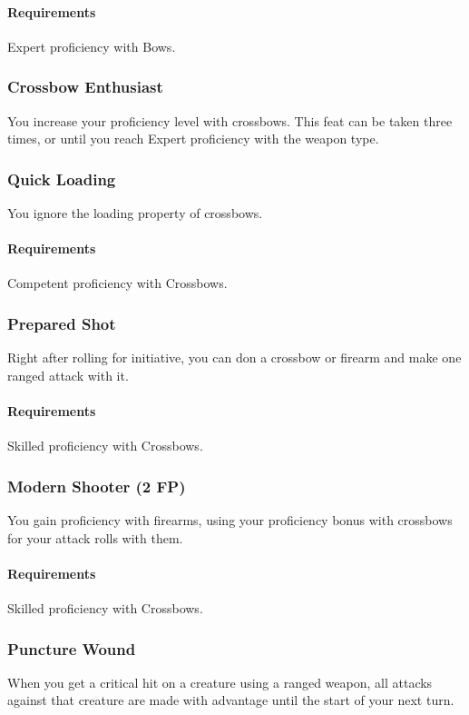     \paragraph{Requirements} Expert proficiency with Bows.
\subsubsection{Crossbow Enthusiast} \label{feat::crossbowenthusiast}
    You increase your proficiency level with crossbows.
    This feat can be taken three times, or until you reach Expert proficiency with the weapon type.
\subsubsection{Quick Loading} \label{feat::quickloading}
    You ignore the loading property of crossbows.
    \paragraph{Requirements} Competent proficiency with Crossbows.
\subsubsection{Prepared Shot} \label{feat::preparedshot}
    Right after rolling for initiative, you can don a crossbow or firearm and make one ranged attack with it.
    \paragraph{Requirements} Skilled proficiency with Crossbows.
\subsubsection{Modern Shooter (2 FP)} \label{feat::modernshooter}
    You gain proficiency with firearms, using your proficiency bonus with crossbows for your attack rolls with them.
    \paragraph{Requirements} Skilled proficiency with Crossbows.
\subsubsection{Puncture Wound} \label{feat::puncturewound}
    When you get a critical hit on a creature using a ranged weapon, all attacks against that creature are made with advantage until the start of your next turn.
